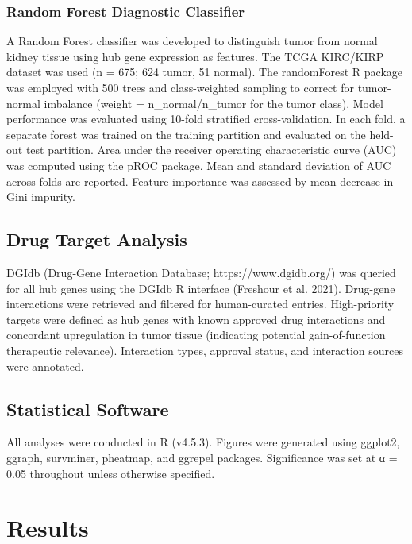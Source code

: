 \documentclass[
  12pt,
]{article}
\begin{document}
\subsubsection{Random Forest Diagnostic
Classifier}\label{random-forest-diagnostic-classifier}

A Random Forest classifier was developed to distinguish tumor from
normal kidney tissue using hub gene expression as features. The TCGA
KIRC/KIRP dataset was used (n = 675; 624 tumor, 51 normal). The
randomForest R package was employed with 500 trees and class-weighted
sampling to correct for tumor-normal imbalance (weight =
n\_normal/n\_tumor for the tumor class). Model performance was evaluated
using 10-fold stratified cross-validation. In each fold, a separate
forest was trained on the training partition and evaluated on the
held-out test partition. Area under the receiver operating
characteristic curve (AUC) was computed using the pROC package. Mean and
standard deviation of AUC across folds are reported. Feature importance
was assessed by mean decrease in Gini impurity.

\subsection{Drug Target Analysis}\label{drug-target-analysis}

DGIdb (Drug-Gene Interaction Database; https://www.dgidb.org/) was
queried for all hub genes using the DGIdb R interface (Freshour et al.
2021). Drug-gene interactions were retrieved and filtered for
human-curated entries. High-priority targets were defined as hub genes
with known approved drug interactions and concordant upregulation in
tumor tissue (indicating potential gain-of-function therapeutic
relevance). Interaction types, approval status, and interaction sources
were annotated.

\subsection{Statistical Software}\label{statistical-software}

All analyses were conducted in R (v4.5.3). Figures were generated using
ggplot2, ggraph, survminer, pheatmap, and ggrepel packages. Significance
was set at α = 0.05 throughout unless otherwise specified.

\section{Results}\label{results}
\end{document}
